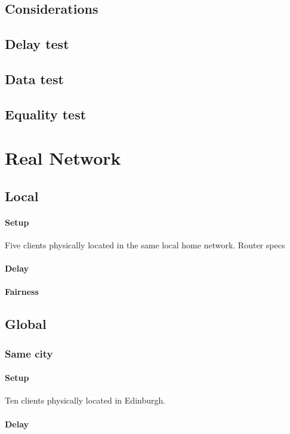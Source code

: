 \documentclass[12pt]{article}
\begin{document}
\subsection{Considerations}
\subsection{Delay test}
\subsection{Data test}
\subsection{Equality test}

\section{Real Network}
\subsection{Local}
\paragraph{Setup}
Five clients physically located in the same local home network.
Router specs
\paragraph{Delay}
\paragraph{Fairness}

\subsection{Global}
\subsubsection{Same city}
\paragraph{Setup}
Ten clients physically located in Edinburgh.
\paragraph{Delay}
\end{document}
